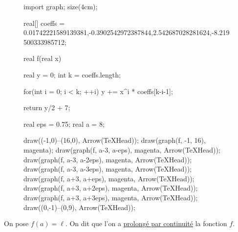 \begin{multicols}{2}
	\begin{figure}[H]
		\centering
		\begin{asy}
			import graph;
			size(4cm);

			real[] coeffs = {0.01742221589139381,-0.3902542972387844,2.542687028281624,-8.219500333985712};

			real f(real x) {
				real y = 0;
				int k = coeffs.length;

				for(int i = 0; i < k; ++i) {
					y += x^i * coeffs[k-i-1];
				}

				return y/2 + 7;
			}

			real eps = 0.75;
			real a = 8;

			draw((-1,0)--(16,0), Arrow(TeXHead));
			draw(graph(f, -1, 16), magenta);
			draw(graph(f, a-3, a-eps), magenta, Arrow(TeXHead));
			draw(graph(f, a-3, a-2eps), magenta, Arrow(TeXHead));
			draw(graph(f, a-3, a-3eps), magenta, Arrow(TeXHead));
			draw(graph(f, a+3, a+eps), magenta, Arrow(TeXHead));
			draw(graph(f, a+3, a+2eps), magenta, Arrow(TeXHead));
			draw(graph(f, a+3, a+3eps), magenta, Arrow(TeXHead));
			draw((0,-1)--(0,9), Arrow(TeXHead));
		\end{asy}
	\end{figure}

	On pose $f(a) = \ell$. On dit que l'on a \underline{prolongé par continuité} la fonction $f$.
\end{multicols}
